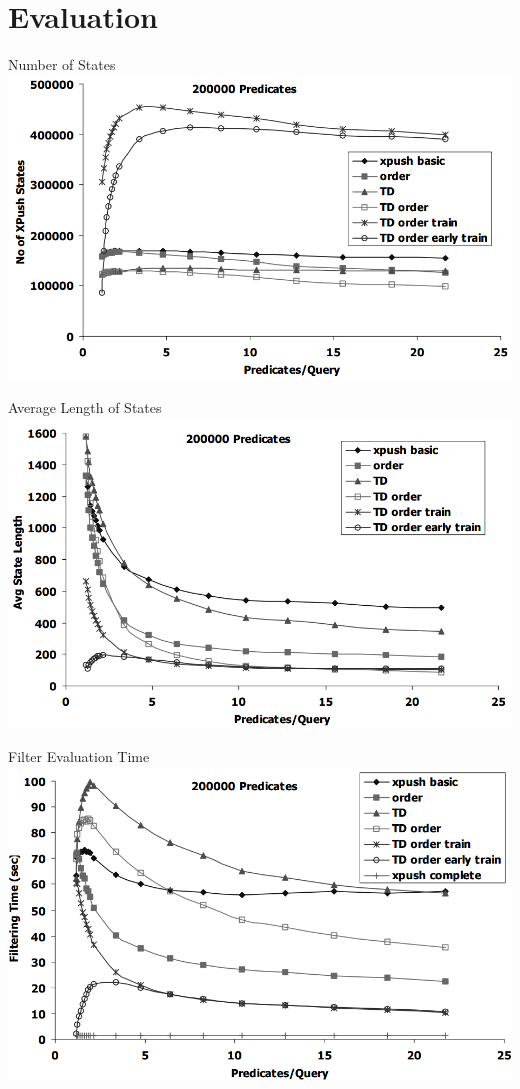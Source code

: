 \documentclass[mathserif,serif]{beamer}
\begin{document}
\section{Evaluation}
\begin{frame}{Number of States}
  \includegraphics[width=\textwidth]{states}
\end{frame}

\begin{frame}{Average Length of States}
  \includegraphics[width=\textwidth]{avglen}
\end{frame}

\begin{frame}{Filter Evaluation Time}
  \includegraphics[width=\textwidth]{filtertime}
\end{frame}
\end{document}
